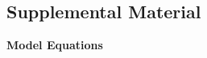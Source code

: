 \documentclass[
  english,
  man, noextraspace]{apa7}
\begin{document}
\endgroup


\clearpage
\makeatletter
\efloat@restorefloats
\makeatother


\begin{appendix}
\renewcommand{\appendixname}{\textcolor{white}{.}}

\hypertarget{supplemental-material}{%
\section{Supplemental Material}\label{supplemental-material}}

\renewcommand{\thefigure}{S\arabic{figure}} \setcounter{figure}{0}
\renewcommand{\thetable}{S\arabic{table}} \setcounter{table}{0}

\setcounter{page}{1}

\noindent \textbf{Model Equations}


\end{appendix}
\end{document}
